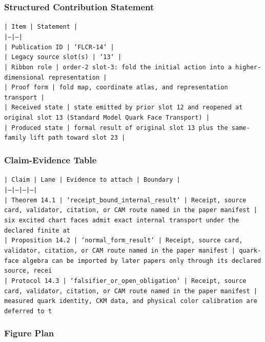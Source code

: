 \documentclass[11pt]{article}
\begin{document}
\subsubsection*{Structured Contribution Statement}

\noindent\texttt{| Item | Statement |}\\
\noindent\texttt{|---|---|}\\
\noindent\texttt{| Publication ID | `FLCR-14` |}\\
\noindent\texttt{| Legacy source slot(s) | `13` |}\\
\noindent\texttt{| Ribbon role | order-2 slot-3: fold the initial action into a higher-dimensional representation |}\\
\noindent\texttt{| Proof form | fold map, coordinate atlas, and representation transport |}\\
\noindent\texttt{| Received state | state emitted by prior slot 12 and reopened at original slot 13 (Standard Model Quark Face Transport) |}\\
\noindent\texttt{| Produced state | formal result of original slot 13 plus the same-family lift path toward slot 23 |}\\

\subsubsection*{Claim-Evidence Table}

\noindent\texttt{| Claim | Lane | Evidence to attach | Boundary |}\\
\noindent\texttt{|---|---|---|---|}\\
\noindent\texttt{| Theorem 14.1 | `receipt\_bound\_internal\_result` | Receipt, source card, validator, citation, or CAM route named in the paper manifest | six excited chart faces admit exact internal transport under the declared finite at}\\
\noindent\texttt{| Proposition 14.2 | `normal\_form\_result` | Receipt, source card, validator, citation, or CAM route named in the paper manifest | quark-face algebra can be imported by later papers only through its declared source, recei}\\
\noindent\texttt{| Protocol 14.3 | `falsifier\_or\_open\_obligation` | Receipt, source card, validator, citation, or CAM route named in the paper manifest | measured quark identity, CKM data, and physical color calibration are deferred to t}\\

\subsubsection*{Figure Plan}
\end{document}
